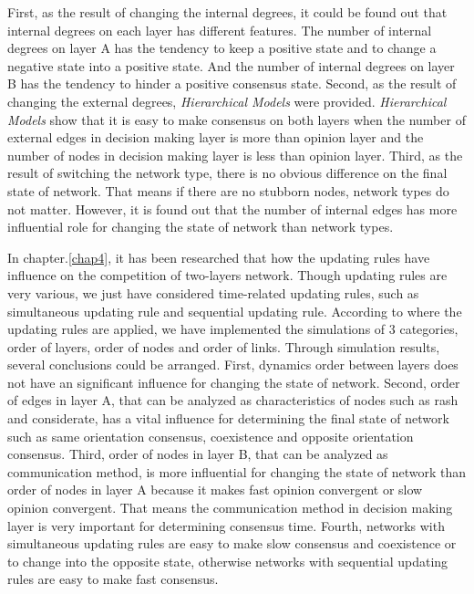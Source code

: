 First, as the result of changing the internal degrees, it could be found out that internal degrees on each layer has different features. The number of internal degrees on layer A has the tendency to keep a positive state and to change a negative state into a positive state. And the number of internal degrees on layer B has the tendency to hinder a positive consensus state. Second, as the result of changing the external degrees, \textit{Hierarchical Models} were provided. \textit{Hierarchical Models} show that it is easy to make consensus on both layers when the number of external edges in decision making layer is more than opinion layer and the number of nodes in decision making layer is less than opinion layer. Third, as the result of switching the network type, there is no obvious difference on the final state of network. That means if there are no stubborn nodes, network types do not matter. However, it is found out that the number of internal edges has more influential role for changing the state of network than network types.

In chapter.\ref{chap4}, it has been researched that how the updating rules have influence on the competition of two-layers network. Though updating rules are very various, we just have considered time-related updating rules, such as simultaneous updating rule and sequential updating rule. According to where the updating rules are applied, we have implemented the simulations of 3 categories, order of layers, order of nodes and order of links. Through simulation results, several conclusions could be arranged. First, dynamics order between layers does not have an significant influence for changing the state of network. Second, order of edges in layer A, that can be analyzed as characteristics of nodes such as rash and considerate, has a vital influence for determining the final state of network such as same orientation consensus, coexistence and opposite orientation consensus. Third, order of nodes in layer B, that can be analyzed as communication method, is more influential for changing the state of network than order of nodes in layer A because it makes fast opinion convergent or slow opinion convergent. That means the communication method in decision making layer is very important for determining consensus time. Fourth, networks with simultaneous updating rules are easy to make slow consensus and coexistence or to change into the opposite state, otherwise networks with sequential updating rules are easy to make fast consensus.

